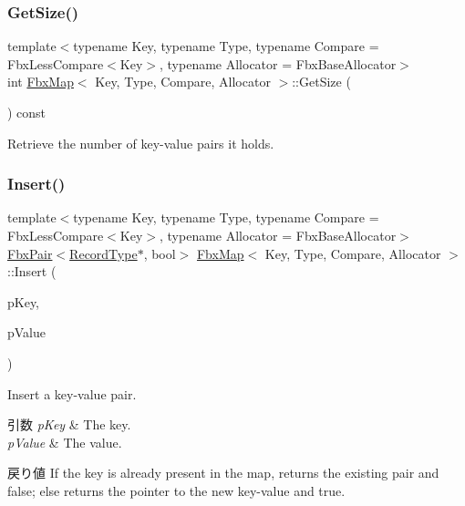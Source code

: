 \subsubsection{\texorpdfstring{Get\+Size()}{GetSize()}}
{\footnotesize\ttfamily template$<$typename Key, typename Type, typename Compare = Fbx\+Less\+Compare$<$\+Key$>$, typename Allocator = Fbx\+Base\+Allocator$>$ \\
int \hyperlink{class_fbx_map}{Fbx\+Map}$<$ Key, Type, Compare, Allocator $>$\+::Get\+Size (\begin{DoxyParamCaption}{ }\end{DoxyParamCaption}) const}



Retrieve the number of key-\/value pairs it holds. 

\mbox{\label{class_fbx_map_a520c1d971dfe2401aa3d9824a0344ce4}} 
\subsubsection{\texorpdfstring{Insert()}{Insert()}}
{\footnotesize\ttfamily template$<$typename Key, typename Type, typename Compare = Fbx\+Less\+Compare$<$\+Key$>$, typename Allocator = Fbx\+Base\+Allocator$>$ \\
\hyperlink{class_fbx_pair}{Fbx\+Pair}$<$\hyperlink{class_fbx_map_af8fc887461b3bf29f41aa36d15ddb54f}{Record\+Type}$\ast$, bool$>$ \hyperlink{class_fbx_map}{Fbx\+Map}$<$ Key, Type, Compare, Allocator $>$\+::Insert (\begin{DoxyParamCaption}\item[{const \hyperlink{class_fbx_map_ad8392c83b6f8eeb9e0706bcc8674270a}{Key\+Type} \&}]{p\+Key,  }\item[{const \hyperlink{class_fbx_map_abea530b1192b31c3cf05fbf247e3dcaa}{Value\+Type} \&}]{p\+Value }\end{DoxyParamCaption})}

Insert a key-\/value pair. 
\begin{DoxyParams}{引数}
{\em p\+Key} & The key. \\
\hline
{\em p\+Value} & The value. \\
\hline
\end{DoxyParams}
\begin{DoxyReturn}{戻り値}
If the key is already present in the map, returns the existing pair and false; else returns the pointer to the new key-\/value and true. 
\end{DoxyReturn}
\mbox{\label{class_fbx_map_af27d42885327b837114b1c51373be612}} 
